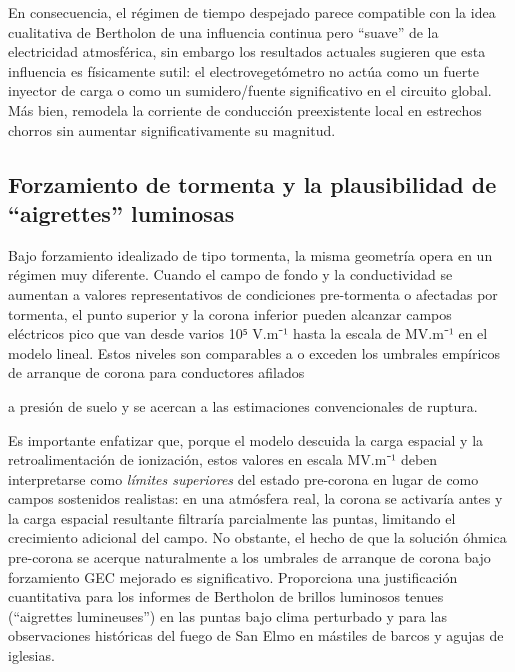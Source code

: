 \documentclass[
]{article}
\begin{document}
En consecuencia, el régimen de tiempo despejado parece compatible con la
idea cualitativa de Bertholon de una influencia continua pero ``suave''
de la electricidad atmosférica, sin embargo los resultados actuales
sugieren que esta influencia es físicamente sutil: el electrovegetómetro
no actúa como un fuerte inyector de carga o como un sumidero/fuente
significativo en el circuito global. Más bien, remodela la corriente de
conducción preexistente local en estrechos chorros sin aumentar
significativamente su magnitud.

\subsection{Forzamiento de tormenta y la plausibilidad de ``aigrettes''
luminosas}\label{forzamiento-de-tormenta-y-la-plausibilidad-de-aigrettes-luminosas}

Bajo forzamiento idealizado de tipo tormenta, la misma geometría opera
en un régimen muy diferente. Cuando el campo de fondo y la conductividad
se aumentan a valores representativos de condiciones pre-tormenta o
afectadas por tormenta, el punto superior y la corona inferior pueden
alcanzar campos eléctricos pico que van desde varios 10⁵ V.m⁻¹ hasta la
escala de MV.m⁻¹ en el modelo lineal. Estos niveles son comparables a o
exceden los umbrales empíricos de arranque de corona para conductores
afilados

a presión de suelo y se acercan a las estimaciones convencionales de
ruptura.

Es importante enfatizar que, porque el modelo descuida la carga espacial
y la retroalimentación de ionización, estos valores en escala MV.m⁻¹
deben interpretarse como \emph{límites superiores} del estado pre-corona
en lugar de como campos sostenidos realistas: en una atmósfera real, la
corona se activaría antes y la carga espacial resultante filtraría
parcialmente las puntas, limitando el crecimiento adicional del campo.
No obstante, el hecho de que la solución óhmica pre-corona se acerque
naturalmente a los umbrales de arranque de corona bajo forzamiento GEC
mejorado es significativo. Proporciona una justificación cuantitativa
para los informes de Bertholon de brillos luminosos tenues (``aigrettes
lumineuses'') en las puntas bajo clima perturbado y para las
observaciones históricas del fuego de San Elmo en mástiles de barcos y
agujas de iglesias.
\end{document}
